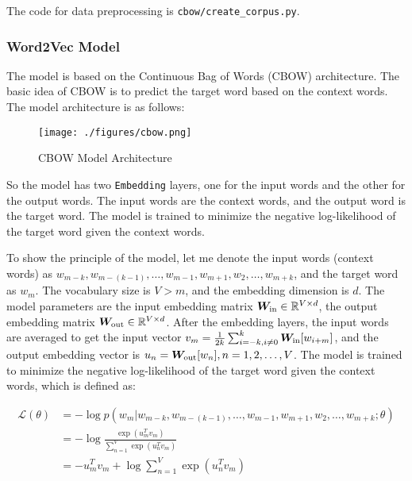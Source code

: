 \documentclass[UTF8,a4paper,12pt]{article}
\makeatletter
\DeclareRobustCommand{\BM}[1]{%
  \ifcat\noexpand#1\relax\bm{\boldUppercaseItalicGreek{#1}}\else\bm{#1}\fi
}
\newcommand{\boldUppercaseItalicGreek}[1]{\csname var\expandafter\@gobble\string#1\endcsname}
\newcommand{\M}[1]{\BM{#1}} %
\makeatother
\begin{document}
The code for data preprocessing is \texttt{cbow/create\_corpus.py}.

\subsubsection{Word2Vec Model}

The model is based on the Continuous Bag of Words (CBOW) architecture. The basic idea of CBOW is to predict the target word based on the context words. The model architecture is as follows:

\begin{figure}[h]
    \centering
    \texttt{[image: ./figures/cbow.png]}
    \caption{\quad CBOW Model Architecture}
    \label{fig:cbow}
\end{figure}

So the model has two \texttt{Embedding} layers, one for the input words and the other for the output words. The input words are the context words, and the output word is the target word. The model is trained to minimize the negative log-likelihood of the target word given the context words.

To show the principle of the model, let me denote the input words (context words) as $w_{m-k}, w_{m-(k-1)}, \ldots, w_{m-1}, w_{m+1}, w_{2}, \ldots, w_{m+k}$, and the target word as $w_m$. The vocabulary size is $V>m$, and the embedding dimension is $d$. The model parameters are the input embedding matrix $\M{W}_{\text{in}} \in \mathbb{R}^{V \times d}$, the output embedding matrix $\M{W}_{\text{out}} \in \mathbb{R}^{V \times d}$. After the embedding layers, the input words are averaged to get the input vector $v_m = \frac{1}{2k} \sum_{i=-k,i\neq 0}^k \M{W}_{\text{in}}[w_{i+m}]$, and the output embedding vector is $u_n = \M{W}_{\text{out}}[w_n], n=1,2,\ldots,V$. The model is trained to minimize the negative log-likelihood of the target word given the context words, which is defined as:

\begin{equation}
    \begin{aligned}
        \mathcal{L}(\theta) &= -\log p(w_m|w_{m-k}, w_{m-(k-1)}, \ldots, w_{m-1}, w_{m+1}, w_{2}, \ldots, w_{m+k}; \theta) \\
        &= -\log \frac{\exp(u_m^T v_m)}{\sum_{n=1}^V \exp(u_n^T v_m)} \\
        &= -u_m^T v_m + \log \sum_{n=1}^V \exp(u_n^T v_m)
    \end{aligned}
\end{equation}
\end{document}
